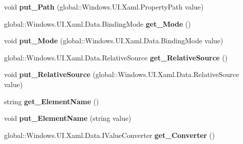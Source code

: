 \begin{DoxyCompactItemize}
void {\bfseries put\+\_\+\+Path} (global\+::\+Windows.\+U\+I.\+Xaml.\+Property\+Path value)
\item 
\mbox{\label{interface_windows_1_1_u_i_1_1_xaml_1_1_data_1_1_i_binding_a0b5420b11dcee1ba04cc22736c406538}} 
global\+::\+Windows.\+U\+I.\+Xaml.\+Data.\+Binding\+Mode {\bfseries get\+\_\+\+Mode} ()
\item 
\mbox{\label{interface_windows_1_1_u_i_1_1_xaml_1_1_data_1_1_i_binding_a1677010e1baf985a2a7cb5a399ca34a8}} 
void {\bfseries put\+\_\+\+Mode} (global\+::\+Windows.\+U\+I.\+Xaml.\+Data.\+Binding\+Mode value)
\item 
\mbox{\label{interface_windows_1_1_u_i_1_1_xaml_1_1_data_1_1_i_binding_ae412c463e60fc889a9838767ab62109a}} 
global\+::\+Windows.\+U\+I.\+Xaml.\+Data.\+Relative\+Source {\bfseries get\+\_\+\+Relative\+Source} ()
\item 
\mbox{\label{interface_windows_1_1_u_i_1_1_xaml_1_1_data_1_1_i_binding_ae29a2f22aa4de72a0e7619934ac6e60a}} 
void {\bfseries put\+\_\+\+Relative\+Source} (global\+::\+Windows.\+U\+I.\+Xaml.\+Data.\+Relative\+Source value)
\item 
\mbox{\label{interface_windows_1_1_u_i_1_1_xaml_1_1_data_1_1_i_binding_a0dd35d95c316a5990ee063205f2afa4f}} 
string {\bfseries get\+\_\+\+Element\+Name} ()
\item 
\mbox{\label{interface_windows_1_1_u_i_1_1_xaml_1_1_data_1_1_i_binding_a4a547237eb0c5a322ff147af7bffa296}} 
void {\bfseries put\+\_\+\+Element\+Name} (string value)
\item 
\mbox{\label{interface_windows_1_1_u_i_1_1_xaml_1_1_data_1_1_i_binding_aeb748478fa74d3af88e1a82f20a682c4}} 
global\+::\+Windows.\+U\+I.\+Xaml.\+Data.\+I\+Value\+Converter {\bfseries get\+\_\+\+Converter} ()
\item 
\mbox{\label{interface_windows_1_1_u_i_1_1_xaml_1_1_data_1_1_i_binding_a6f90eb586d1b47f03de725076ef98329}} 

\end{DoxyCompactItemize}
